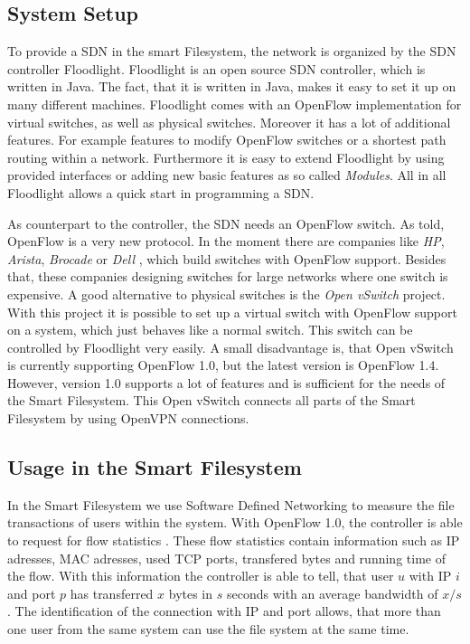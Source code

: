 \subsection{System Setup}
To provide a SDN in the smart Filesystem, the network is organized by the SDN controller Floodlight\cite{flood}. Floodlight is an open source SDN controller, which is written in Java. The fact, that it is written in Java, makes it easy to set it up on many different machines. Floodlight comes with an OpenFlow implementation for virtual switches, as well as physical switches. Moreover it has a lot of additional features. For example features to modify OpenFlow switches or a shortest path routing within a network. Furthermore it is easy to extend Floodlight by using provided interfaces or adding new basic features as so called \textit{Modules}. All in all Floodlight allows a quick start in programming a SDN.

As counterpart to the controller, the SDN needs an OpenFlow switch. As told, OpenFlow is a very new protocol. In the moment there are companies like \textit{HP}, \textit{Arista}, \textit{Brocade} or \textit{Dell} , which build switches with OpenFlow support. Besides that, these companies designing switches for large networks where one switch is expensive. A good alternative to physical switches is the \textit{Open vSwitch} project\cite{ovs2}. With this project it is possible to set up a virtual switch with OpenFlow support on a system, which just behaves like a normal switch. This switch can be controlled by Floodlight very easily. A small disadvantage is, that Open vSwitch is currently supporting OpenFlow 1.0\cite{ovs}, but the latest version is OpenFlow 1.4\cite{ofspec4}. However, version 1.0 supports a lot of features and is sufficient for the needs of the Smart Filesystem.
This Open vSwitch connects all parts of the Smart Filesystem by using OpenVPN connections.     
   
\subsection{Usage in the Smart Filesystem}\label{usage}
In the Smart Filesystem we use Software Defined Networking to measure the file transactions of users within the system. With OpenFlow 1.0, the controller is able to request for flow statistics \cite[P. 31]{ofspec}. These flow statistics contain information such as IP adresses, MAC adresses, used TCP ports, transfered bytes and running time of the flow. With this information the controller is able to tell, that user $u$ with IP $i$ and port $p$ has transferred $x$ bytes in $s$ seconds with an average bandwidth of $x/s$. The identification of the connection with IP and port allows, that more than one user from the same system can use the file system at the same time.

